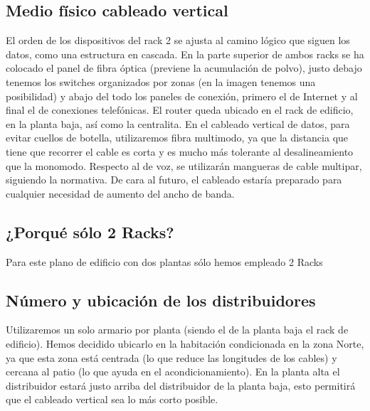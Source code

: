 \subsection{Medio físico cableado vertical}
El orden de los dispositivos del rack 2 se ajusta al camino lógico que siguen los datos, como una estructura en cascada. En la parte superior de ambos racks se ha colocado el panel de fibra óptica (previene la acumulación de polvo), justo debajo tenemos los switches organizados por zonas (en la imagen tenemos una posibilidad) y abajo del todo los paneles de conexión, primero el de Internet y al final el de conexiones telefónicas. El router queda ubicado en el rack de edificio, en la planta baja, así como la centralita. En el cableado vertical de datos, para evitar cuellos de botella, utilizaremos fibra multimodo, ya que la distancia que tiene que recorrer el cable es corta y es mucho más tolerante al desalineamiento que la monomodo. Respecto al de voz, se utilizarán mangueras de cable multipar, siguiendo la normativa. De cara al futuro, el cableado estaría preparado para cualquier necesidad de aumento del ancho de banda.
\subsection{¿Porqué sólo 2 Racks?}
Para este plano de edificio con dos plantas sólo hemos empleado 2 Racks
\subsection{Número y ubicación de los distribuidores}
Utilizaremos un solo armario por planta (siendo el de la planta baja el rack de edificio). Hemos decidido ubicarlo en la habitación condicionada en la zona Norte, ya que esta zona está centrada (lo que reduce las longitudes de los cables) y cercana al patio (lo que ayuda en el acondicionamiento). En la planta alta el distribuidor estará justo arriba del distribuidor de la planta baja, esto permitirá que el cableado vertical sea lo más corto posible.